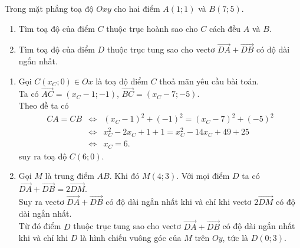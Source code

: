 \begin{bt}%
	Trong mặt phẳng toạ độ $Oxy$ cho hai điểm $A(1;1)$ và $B(7;5)$.
	\begin{enumerate}
		\item Tìm toạ độ của điểm $C$ thuộc trục hoành sao cho $C$ cách đều $A$ và $B$.
		\item Tìm toạ độ của điểm $D$ thuộc trục tung sao cho vectơ $\overrightarrow{DA}+\overrightarrow{DB}$ có độ dài ngắn nhất.
	\end{enumerate}	
	\loigiai
	{
		\begin{enumerate}
			\item Gọi $C\left(x_C;0\right)\in Ox$ là toạ độ điểm $C$ thoả mãn yêu cầu bài toán.\\
			Ta có $\overrightarrow{AC}=\left(x_C-1;-1\right)$, $\overrightarrow{BC}=\left(x_C-7;-5\right)$.\\
			Theo đề ta có \allowdisplaybreaks
			\begin{eqnarray*}
				CA=CB&\Leftrightarrow&\left(x_C-1\right)^2+(-1)^2=\left(x_C-7\right)^2+(-5)^2\\
				&\Leftrightarrow&x^2_C-2x_C+1+1=x^2_C-14x_C+49+25\\
				&\Leftrightarrow&x_C=6.
			\end{eqnarray*}
			suy ra toạ độ $C\left(6;0\right)$.
			\item Gọi $M$ là trung điểm $AB$. Khi đó $M\left(4;3\right)$. Với mọi điểm $D$ ta có $\overrightarrow{DA}+\overrightarrow{DB}=2\overrightarrow{DM}$.\\
			Suy ra vectơ $\overrightarrow{DA}+\overrightarrow{DB}$ có độ dài ngắn nhất khi và chỉ khi vectơ $2\overrightarrow{DM}$ có độ dài ngắn nhất.\\
			Từ đó điểm $D$ thuộc trục tung sao cho vectơ $\overrightarrow{DA}+\overrightarrow{DB}$ có độ dài ngắn nhất khi và chỉ khi $D$ là hình chiếu vuông góc của $M$ trên $Oy$, tức là $D\left(0;3\right)$.
		\end{enumerate}
	}
\end{bt}

